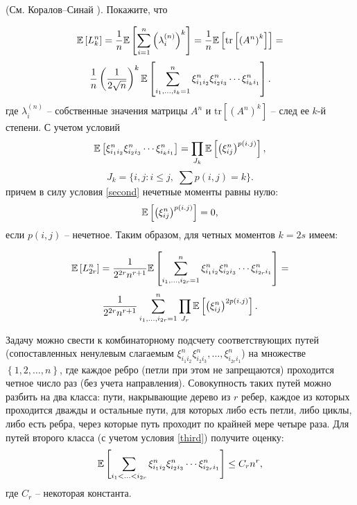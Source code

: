 \begin{ordre} (См. Коралов--Синай \cite{7}). Покажите, что 

\[\mathrm{{\mathbb E}}\left[L_{k}^{n} \right]=\frac{1}{n} \mathrm{{\mathbb E}}\left[\sum _{i=1}^{n}\left(\lambda _{i}^{(n)} \right)^{k}  \right]=\frac{1}{n} \mathrm{{\mathbb E}}\left[\mathrm{tr}\left[\left(A^{n} \right)^{k} \right]\right] = \]\[ \frac{1}{n} \left(\frac{1}{2\sqrt{n} } \right)^{k} \mathrm{{\mathbb E}}\left[\sum _{i_{1} ,\ldots ,i_{k} =1}^{n}\xi _{i_{1} i_{2} }^{n} \xi _{i_{2} i_{3} }^{n} \cdots \xi _{i_{k} i_{1} }^{n}  \right].\] 
\noindent где $\lambda _{i}^{(n)} $ -- собственные значения матрицы $A^{n} $ и $\mathrm{tr}\left[\left(A^{n} \right)^{k} \right]$ -- след ее $k$-й степени.
С учетом условий \[\mathrm{{\mathbb E}}\left[\xi _{i_{1} i_{2} }^{n} \xi _{i_{2} i_{3} }^{n} \cdots \xi _{i_{k} i_{1} }^{n} \right]=\prod_{J_k} \mathrm{{\mathbb E}}\left[\left(\xi _{ij}^{n} \right)^{p(i.j)} \right], \]\[J_k = \{ i,j: i \leq j, \;
\sum p(i,j) = k\}. \] причем в силу условия \ref{second} нечетные моменты равны нулю: $$\mathrm{{\mathbb E}}\left[\left(\xi _{ij}^{n} \right)^{p(i.j)} \right]=0,$$ если $p(i,j)$ -- нечетное. Таким образом, для четных моментов $k=2s$ имеем:

\[\mathrm{{\mathbb E}}\left[L_{2r}^{n} \right]=\frac{1}{2^{2r} n^{r+1} } \mathrm{{\mathbb E}}\left[\sum _{i_{1} ,\ldots ,i_{2r} =1}^{n}\xi _{i_{1} i_{2} }^{n} \xi _{i_{2} i_{3} }^{n} \cdots \xi _{i_{2r} i_{1} }^{n}  \right]= \]\[ \frac{1}{2^{2r} n^{r+1} } \sum _{i_{1} ,\ldots ,i_{2r} =1}^{n}\prod_{J_r} \mathrm{{\mathbb E}}\left[\left(\xi _{ij}^{n} \right)^{2p(i.j)} \right]  .\] 

 Задачу можно свести к комбинаторному подсчету соответствующих путей (сопоставленных ненулевым слагаемым $\xi _{i_{1} i_{2} }^{n} \xi _{i_{2} i_{3} }^{n}, \ldots, \xi _{i_{2r} i_{1} }^{n} $) на множестве $\left\{1,2,\ldots ,n\right\}$, где каждое ребро (петли при этом не запрещаются) проходится четное число раз (без учета направления). Совокупность таких путей можно разбить на два класса: пути, накрывающие дерево из $r$ ребер, каждое из которых проходится дважды и остальные пути, для которых либо есть петли, либо циклы, либо есть ребра, через которые путь проходит по крайней мере четыре раза. Для путей второго класса (с учетом условия \ref{third}) получите оценку: \[
 \mathrm{{\mathbb E}}\left[
    \sum  \limits_{ i_{1} < \ldots < i_{2r} } \xi _{i_{1} i_{2} }^{n} \xi _{i_{2} i_{3} }^{n} \cdots           \xi _{i_{2r} i_{1} }^{n}  
\right]\le C_{r} n^{r} ,
 \] \noindent где $C_{r} $ -- некоторая константа.


\end{ordre}

